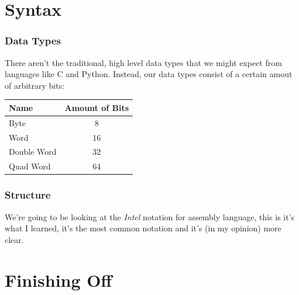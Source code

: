 \documentclass{beamer}
\begin{document}
	\section{Syntax}
	
	\begin{frame}
		\frametitle{Data Types}
		
		There aren't the traditional, high level data types that we might expect from languages like C and Python. Instead, our data types consist of a certain amout of arbitrary bits:
		\newline
		
		\begin{tabular}{|l|c|}
			\hline
			\textbf{Name} & \textbf{Amount of Bits} \\
			\hline
			\hline
			Byte & 8\\
			\hline
			Word & 16\\
			\hline
			Double Word & 32\\
			\hline
			Quad Word & 64\\
			\hline
		\end{tabular}
		
	\end{frame}

	\begin{frame}
		\frametitle{Structure}
		
		We're going to be looking at the \textit{Intel} notation for assembly language, this is it's what I learned, it's the most common notation and it's (in my opinion) more clear.
		\newline
		
		\begin{multicols}{2}
			
			
			
		\end{multicols}
	\end{frame}
	
	\section{Finishing Off}
	
\end{document}
